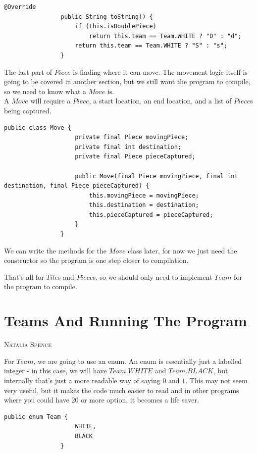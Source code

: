 \documentclass[a4paper]{report}
\makeatletter
\newcommand{\sectionauthor}[1]{%
	{\parindent0pt\vspace*{0pt}%
		\linespread{1.1}\large\scshape#1%
		\par\nobreak\vspace*{10pt}}
	\@afterheading%
}
\makeatother
\begin{document}
			\begin{lstlisting}[frame=top, caption=Piece.java]
				@Override
				public String toString() {
					if (this.isDoublePiece)
						return this.team == Team.WHITE ? "D" : "d";
					return this.team == Team.WHITE ? "S" : "s";
				}
			\end{lstlisting} \bigskip
			
			The last part of $Piece$ is finding where it can move. The movement logic itself is going to be covered in another section, but we still want the program to compile, so we need to know what a $Move$ is. \\
			A $Move$ will require a $Piece$, a start location, an end location, and a list of $Piece$s being captured.
			
			\begin{lstlisting}[frame=top, caption=Move.java]
				public class Move {
					private final Piece movingPiece;
					private final int destination;
					private final Piece pieceCaptured;
					
					public Move(final Piece movingPiece, final int destination, final Piece pieceCaptured) {
						this.movingPiece = movingPiece;
						this.destination = destination;
						this.pieceCaptured = pieceCaptured;
					}
				}
			\end{lstlisting} \bigskip
			
			We can write the methods for the $Move$ class later, for now we just need the constructor so the program is one step closer to compilation.
			
			That's all for $Tile$s and $Piece$s, so we should only need to implement $Team$ for the program to compile.
			
		\section{Teams And Running The Program}\label{sec:in depth example - teams and running the program}
		\sectionauthor{Natalia Spence}
			
			For $Team$, we are going to use an enum. An enum is essentially just a labelled integer - in this case, we will have $Team.WHITE$ and $Team.BLACK$, but internally that's just a more readable way of saying $0$ and $1$. This may not seem very useful, but it makes the code much easier to read and in other programs where you could have 20 or more option, it becomes a life saver.
			
			\begin{lstlisting}[frame=top, caption=Team.java]
				public enum Team {
					WHITE,
					BLACK
				}
			\end{lstlisting} \bigskip
			
\end{document}
